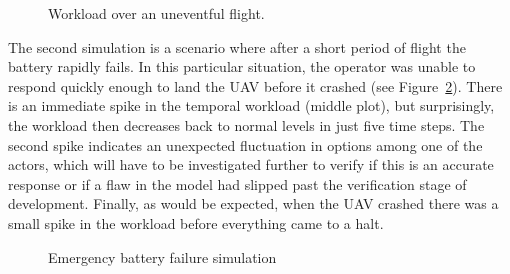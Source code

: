 \begin{figure}[h]
\center
\setlength{\abovecaptionskip}{1mm}
\setlength{\belowcaptionskip}{1mm}
\setlength{\textfloatsep}{1mm}
\setlength{\floatsep}{1mm}
\caption{Workload over an uneventful flight.}
\label{fig:WorkloadSim1}
\end{figure}

The second simulation is a scenario where after a short period of flight the battery rapidly fails. In this particular situation, the operator was unable to respond quickly enough to land the UAV before it crashed (see Figure~\ref{fig:WorkloadSim2}). There is an immediate spike in the temporal workload (middle plot), but surprisingly, the workload then decreases back to normal levels in just five time steps. The second spike indicates an unexpected fluctuation in options among one of the actors, which will have to be investigated further to verify if this is an accurate response or if a flaw in the model had slipped past the verification stage of development. Finally, as would be expected, when the UAV crashed there was a small spike in the workload before everything came to a halt. 

\begin{figure}[h]
\center
\setlength{\abovecaptionskip}{1mm}
\setlength{\belowcaptionskip}{1mm}
\setlength{\textfloatsep}{1mm}
\setlength{\floatsep}{1mm}
\caption{Emergency battery failure simulation}
\label{fig:WorkloadSim2}
\end{figure}
